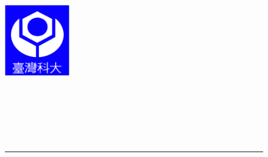 
\newcommand\itsempty{}
%
\begin{titlepage}

\begin{center}
%



\begin{figure}[htbp]
	\begin{minipage}[t]{5cm} 
		\raggedright
		\includegraphics[width=1.1in]{frontpages/ntust_logo.eps}
		\label{fig:ntust_logo}
		\vspace{0.5cm}
	\end{minipage}%
	\begin{minipage}[b]{0.5\textwidth} 
	\centering
	\makebox[3cm][c]{\Huge{\univCname}}\\  %
	\vspace{0.5cm}
	\makebox[3cm][c]{\Huge{\deptCname}}\\ %
	\vspace{0.5cm}
	\\ %
	\end{minipage}%
\\ 
\rule{16cm}{3pt}
\end{figure}



\end{center}
\end{titlepage}
